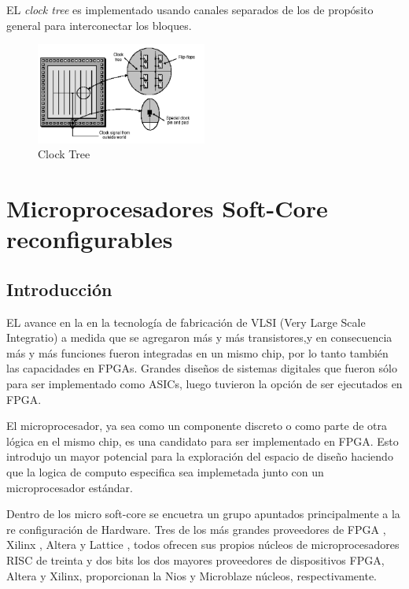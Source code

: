 EL \textit{clock tree} es implementado usando canales separados de los de propósito general para interconectar los bloques.

\begin{figure}[h!]
 \begin{center}
 \includegraphics[width=0.5\textwidth,keepaspectratio=true]{./images/clocktree}
  \caption{Clock Tree}
  \label{fig:esquema}
 \end{center}
\end{figure}


\section{Microprocesadores Soft-Core reconfigurables}

 \subsection{Introducción}

EL avance en la en la tecnología de fabricación de VLSI (Very Large Scale Integratio) a medida que se agregaron más y más transistores,y en consecuencia más y más funciones fueron integradas en un mismo chip, por lo tanto también las capacidades en FPGAs. Grandes diseños de sistemas digitales que fueron sólo para ser implementado como ASICs, luego tuvieron la opción de ser ejecutados en FPGA.

El microprocesador, ya sea como un componente discreto o  como parte de otra lógica en el mismo chip, es una candidato  para ser  implementado en FPGA. Esto introdujo un mayor potencial para la exploración del espacio de diseño haciendo que la logica de computo especifica sea implemetada junto con un microprocesador estándar. \cite{Etiqueta05}

Dentro de los micro soft-core se encuetra un grupo apuntados principalmente a la re configuración de Hardware.
Tres de los más grandes proveedores de FPGA , Xilinx , Altera y Lattice , todos ofrecen sus propios núcleos de microprocesadores RISC de treinta y dos bits los dos mayores proveedores de dispositivos FPGA, Altera y Xilinx, proporcionan la Nios y Microblaze núcleos, respectivamente.

